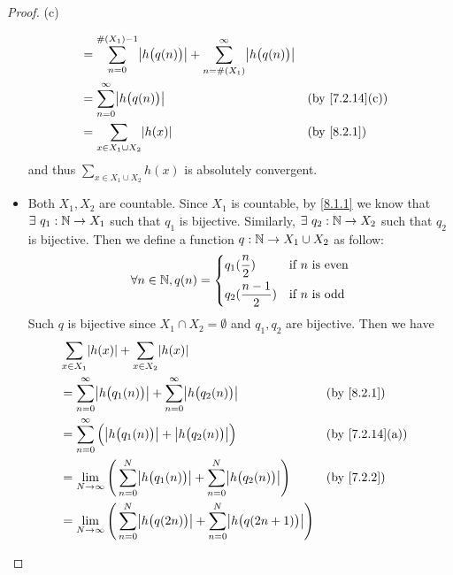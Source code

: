 \begin{proof}{(c)}
\begin{itemize}
\begin{align*}
             & = \sum_{n = 0}^{\#(X_1) - 1} \abs{h\big(q(n)\big)} + \sum_{n = \#(X_1)}^\infty \abs{h\big(q(n)\big)}                                   \\
             & = \sum_{n = 0}^\infty \abs{h\big(q(n)\big)}                                                          &  & \text{(by \cref{7.2.14}(c))} \\
             & = \sum_{x \in X_1 \cup X_2} \abs{h(x)}                                                               &  & \text{(by \cref{8.2.1})}
          \end{align*}
          and thus \(\sum_{x \in X_1 \cup X_2} h(x)\) is absolutely convergent.
    \item Both \(X_1, X_2\) are countable.
          Since \(X_1\) is countable, by \cref{8.1.1} we know that \(\exists\ q_1 : \mathbb{N} \to X_1\) such that \(q_1\) is bijective.
          Similarly, \(\exists\ q_2 : \mathbb{N} \to X_2\) such that \(q_2\) is bijective.
          Then we define a function \(q : \mathbb{N} \to X_1 \cup X_2\) as follow:
          \[
            \forall n \in \mathbb{N}, q(n) = \begin{dcases}
              q_1(\dfrac{n}{2})     & \text{if } n \text{ is even} \\
              q_2(\dfrac{n - 1}{2}) & \text{if } n \text{ is odd}
            \end{dcases}
          \]
          Such \(q\) is bijective since \(X_1 \cap X_2 = \emptyset\) and \(q_1, q_2\) are bijective.
          Then we have
          \begin{align*}
             & \sum_{x \in X_1} \abs{h(x)} + \sum_{x \in X_2} \abs{h(x)}                                                                                             \\
             & = \sum_{n = 0}^\infty \abs{h\big(q_1(n)\big)} + \sum_{n = 0}^\infty \abs{h\big(q_2(n)\big)}                         &  & \text{(by \cref{8.2.1})}     \\
             & = \sum_{n = 0}^\infty \Big(\abs{h\big(q_1(n)\big)} + \abs{h\big(q_2(n)\big)}\Big)                                   &  & \text{(by \cref{7.2.14}(a))} \\
             & = \lim_{N \to \infty} \Bigg(\sum_{n = 0}^N \abs{h\big(q_1(n)\big)} + \sum_{n = 0}^N \abs{h\big(q_2(n)\big)}\Bigg)   &  & \text{(by \cref{7.2.2})}     \\
             & = \lim_{N \to \infty} \Bigg(\sum_{n = 0}^N \abs{h\big(q(2n)\big)} + \sum_{n = 0}^N \abs{h\big(q(2n + 1)\big)}\Bigg)                                   \\

\end{align*}
\end{itemize}
\end{proof}
